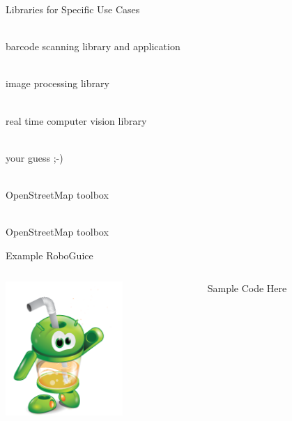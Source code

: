 \documentclass[aspectratio=169]{beamer}
\newcommand{\surl}[1] {{\tiny \url{#1}}}
\begin{document}
  \begin{frame}{Libraries for Specific Use Cases}
      \begin{description}
        \item<1->[ZXing \surl{http://code.google.com/p/zxing/}] \hfill \\ barcode scanning library and application
        \item<2->[Jon's Java Imaging Library \surl{http://code.google.com/p/jjil/}] \hfill \\ image processing library
        \item<3->[OpenCV-Android \surl{http://billmccord.github.com/OpenCV-Android/}] \hfill \\ real time computer vision library
        \item<4->[Facebook Android SDK \surl{https://github.com/facebook/facebook-android-sdk}] \hfill \\ your guess ;-)
        \item<5->[MapsForge \surl{http://code.google.com/p/mapsforge/}] \hfill \\ OpenStreetMap toolbox
        \item<6->[OSMDroid \surl{http://code.google.com/p/osmdroid/}] \hfill \\ OpenStreetMap toolbox
      \end{description}
    \end{frame}

    \begin{frame}{Example RoboGuice}
      \begin{columns}[t]
        \begin{column}{0.5\textwidth}
          \begin{center}
            \includegraphics[height=2.0in]{roboguice.png}
          \end{center}
        \end{column}

        \begin{column}{0.5\textwidth}
          Sample Code Here
        \end{column}
      \end{columns}
    \end{frame}
  
\end{document}
